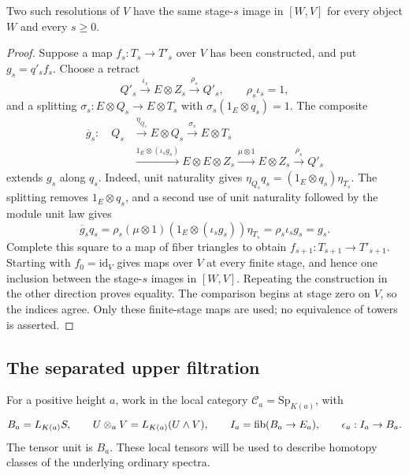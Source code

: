 \begin{lemma}
\label{lem:adams-stage-images}
Two such resolutions of $V$ have the same stage-$s$ image in $[W,V]$
for every object $W$ and every $s\geq0$.
\end{lemma}
\begin{proof}
Suppose a map $f_s:T_s\to T'_s$ over $V$ has been constructed, and
put $g_s=q'_sf_s$. Choose a retract
\[
 Q'_s\xrightarrow{\iota_s}E\otimes Z_s
       \xrightarrow{\rho_s}Q'_s,\qquad \rho_s\iota_s=1,
\]
and a splitting
$\sigma_s:E\otimes Q_s\to E\otimes T_s$ with
$\sigma_s(1_E\otimes q_s)=1$. The composite
\begin{equation}\label{wimg:extension}
\begin{aligned}
 \overline g_s:\quad Q_s
 &\xrightarrow{\eta_{Q_s}}E\otimes Q_s
 \xrightarrow{\sigma_s}E\otimes T_s\\
 &\xrightarrow{1_E\otimes(\iota_sg_s)}E\otimes E\otimes Z_s
 \xrightarrow{\mu\otimes1}E\otimes Z_s
 \xrightarrow{\rho_s}Q'_s
\end{aligned}
\end{equation}
extends $g_s$ along $q_s$. Indeed, unit naturality gives
$\eta_{Q_s}q_s=(1_E\otimes q_s)\eta_{T_s}$. The splitting removes
$1_E\otimes q_s$, and a second use of unit naturality followed by
the module unit law gives
\[
 \overline g_s q_s
 =\rho_s(\mu\otimes1)(1_E\otimes(\iota_sg_s))\eta_{T_s}
 =\rho_s\iota_sg_s=g_s.
\]
Complete this square to a map of fiber triangles to obtain
$f_{s+1}:T_{s+1}\to T'_{s+1}$. Starting with
$f_0=\mathrm{id}_V$ gives maps over $V$ at every finite stage,
and hence one inclusion between the stage-$s$ images in $[W,V]$.
Repeating the construction in the other direction proves equality.
The comparison begins at stage zero on $V$, so the indices agree.
Only these finite-stage maps are used; no equivalence of towers is
asserted.
\end{proof}

\subsection{The separated upper filtration}

For a positive height $a$, work in the local category
$\mathcal C_a=\mathrm{Sp}_{K(a)}$, with
\[
 B_a=L_{K(a)}S,\qquad
 U\otimes_a V=L_{K(a)}(U\wedge V),\qquad
 I_a=\operatorname{fib}(B_a\to E_a),\qquad \epsilon_a:I_a\to B_a.
\]
The tensor unit is $B_a$. These local tensors will be used to
describe homotopy classes of the underlying ordinary spectra.

